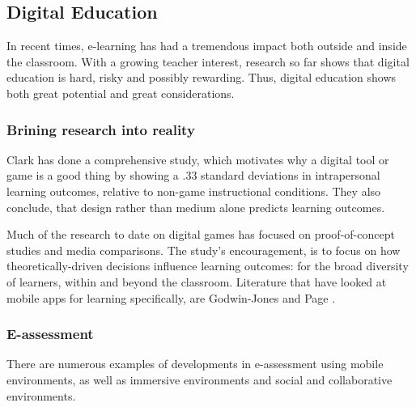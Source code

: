     

    \subsection{Digital Education}

    In recent times, e-learning has had a tremendous impact both outside and inside the classroom. With a growing teacher interest, research so far shows that digital education is hard, risky and possibly rewarding. \citep{luckin} Thus, digital education shows both great potential and great considerations.

    \subsubsection{Brining research into reality}

    Clark \citep{gates} has done a comprehensive study, which motivates why a digital tool or game is a good thing by showing a .33 standard deviations in intrapersonal learning outcomes, relative to non-game instructional conditions. They also conclude, that design rather than medium alone predicts learning outcomes.

    Much of the research to date on digital games has focused on proof-of-concept studies and media comparisons. The study's encouragement, is to focus on how theoretically-driven decisions influence learning outcomes: for the broad diversity of learners, within and beyond the classroom. Literature that have looked at mobile apps for learning specifically, are Godwin-Jones \citep{godwin-jones} and Page \citep{page}.


    \subsubsection{E-assessment}
    There are numerous examples of developments in e-assessment using mobile environments, as well as immersive environments and social and collaborative environments.

